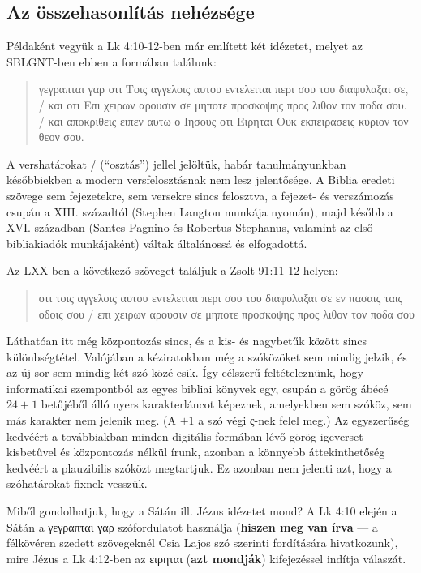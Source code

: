 \documentclass{article}
\newcommand\gr{\selectlanguage{greek}\frenchspacing}
\begin{document}
\subsection{Az összehasonlítás nehézsége}

Példaként vegyük a Lk 4:10-12-ben már említett két idézetet, melyet az SBLGNT-ben ebben a formában találunk:
\begin{quote}
γεγραπται γαρ οτι Τοις αγγελοις αυτου εντελειται περι σου του διαφυλαξαι σε, /
και οτι Επι χειρων αρουσιν σε μηποτε προσκοψης προς λιθον τον ποδα σου. /
και αποκριθεις ειπεν αυτω ο Ιησους οτι Ειρηται Ουκ εκπειρασεις κυριον τον θεον σου.
\end{quote}
A vershatárokat / (``osztás'') jellel jelöltük, habár tanulmányunkban későbbiekben a modern
versfelosztásnak nem lesz jelentősége. A Biblia eredeti szövege sem fejezetekre,
sem versekre sincs felosztva, a fejezet- és verszámozás csupán a XIII. századtól (Stephen Langton munkája nyomán),
majd később a XVI. században (Santes Pagnino és Robertus Stephanus,
valamint az első bibliakiadók munkájaként) váltak általánossá és
elfogadottá.

Az LXX-ben a következő szöveget találjuk a Zsolt 91:11-12 helyen:
\begin{quote}
οτι τοις αγγελοις αυτου εντελειται περι σου του διαφυλαξαι σε εν πασαις ταις οδοις σου /
επι χειρων αρουσιν σε μηποτε προσκοψης προς λιθον τον ποδα σου
\end{quote}
Láthatóan itt még központozás sincs, és a kis- és nagybetűk között sincs
különbségtétel. Valójában a kéziratokban még a szóközöket sem
mindig jelzik, és az új sor sem mindig két szó közé esik.
Így célszerű feltételeznünk, hogy informatikai szempontból az egyes
bibliai könyvek egy, csupán a görög ábécé $24+1$ betűjéből álló nyers karakterláncot
képeznek, amelyekben sem szóköz, sem más karakter nem jelenik meg. (A $+1$ a szó végi
ς-nek felel meg.) Az egyszerűség
kedvéért a továbbiakban minden digitális formában lévő görög igeverset kisbetűvel
és központozás nélkül írunk, azonban a könnyebb áttekinthetőség kedvéért
a plauzibilis szóközt megtartjuk. Ez azonban nem jelenti azt, hogy a szóhatárokat
fixnek vesszük.

Miből gondolhatjuk, hogy a Sátán ill. Jézus idézetet mond? A Lk 4:10 elején a Sátán
a γεγραπται γαρ szófordulatot használja
(\textbf{hiszen meg van írva} --- a félkövéren szedett szövegeknél Csia Lajos
szó szerinti \cite{Csia} fordítására hivatkozunk), mire Jézus a Lk 4:12-ben az
\gr ειρηται (\textbf{azt mondják})
kifejezéssel indítja válaszát.
\end{document}
